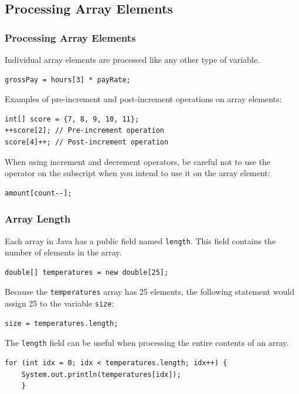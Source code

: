 \documentclass[11pt]{beamer}
\begin{document}
\subsection{Processing Array Elements}
\begin{frame}[fragile]
    \frametitle{Processing Array Elements}
    Individual array elements are processed like any other type of variable.
    \begin{lstlisting}
grossPay = hours[3] * payRate;
    \end{lstlisting}
    Examples of pre-increment and post-increment operations on array elements:
    \begin{lstlisting}
int[] score = {7, 8, 9, 10, 11};
++score[2]; // Pre-increment operation
score[4]++; // Post-increment operation
    \end{lstlisting}
    When using increment and decrement operators, be careful not to use the operator on the subscript when you intend to use it on the array element:
    \begin{lstlisting}
amount[count--];
    \end{lstlisting}
\end{frame}

\begin{frame}[fragile]
    \frametitle{Array Length}
    Each array in Java has a public field named \texttt{length}. This field contains the number of elements in the array.
    \begin{lstlisting}[basicstyle=\ttfamily\footnotesize]
double[] temperatures = new double[25];
    \end{lstlisting}
    Because the \texttt{temperatures} array has 25 elements, the following statement would assign 25 to the variable \texttt{size}:
    \begin{lstlisting}[basicstyle=\ttfamily\footnotesize]
size = temperatures.length;
    \end{lstlisting}
    The \texttt{length} field can be useful when processing the entire contents of an array.
    \begin{lstlisting}[basicstyle=\ttfamily\footnotesize]
for (int idx = 0; idx < temperatures.length; idx++) {
    System.out.println(temperatures[idx]);
    }
    \end{lstlisting}
\end{frame}
\end{document}
